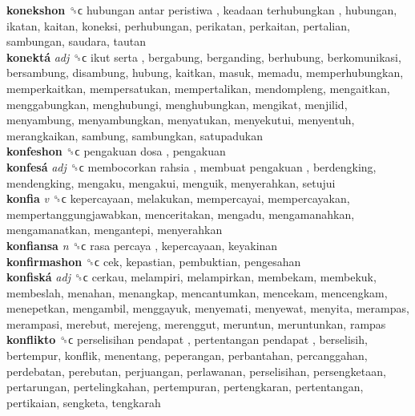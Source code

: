 \textbf{konekshon} ␝ϲ   hubungan antar peristiwa ,  keadaan terhubungkan , hubungan, ikatan, kaitan, koneksi, perhubungan, perikatan, perkaitan, pertalian, sambungan, saudara, tautan  \\
\textbf{konektá} \emph{adj}  ␝ϲ   ikut serta , bergabung, berganding, berhubung, berkomunikasi, bersambung, disambung, hubung, kaitkan, masuk, memadu, memperhubungkan, memperkaitkan, mempersatukan, mempertalikan, mendompleng, mengaitkan, menggabungkan, menghubungi, menghubungkan, mengikat, menjilid, menyambung, menyambungkan, menyatukan, menyekutui, menyentuh, merangkaikan, sambung, sambungkan, satupadukan  \\
\textbf{konfeshon} ␝ϲ   pengakuan dosa , pengakuan  \\
\textbf{konfesá} \emph{adj}  ␝ϲ   membocorkan rahsia ,  membuat pengakuan , berdengking, mendengking, mengaku, mengakui, menguik, menyerahkan, setujui  \\
\textbf{konfia} \emph{v}  ␝ϲ  kepercayaan, melakukan, mempercayai, mempercayakan, mempertanggungjawabkan, menceritakan, mengadu, mengamanahkan, mengamanatkan, mengantepi, menyerahkan  \\
\textbf{konfiansa} \emph{n}  ␝ϲ   rasa percaya , kepercayaan, keyakinan  \\
\textbf{konfirmashon} ␝ϲ  cek, kepastian, pembuktian, pengesahan  \\
\textbf{konfiská} \emph{adj}  ␝ϲ  cerkau, melampiri, melampirkan, membekam, membekuk, membeslah, menahan, menangkap, mencantumkan, mencekam, mencengkam, menepetkan, mengambil, menggayuk, menyemati, menyewat, menyita, merampas, merampasi, merebut, merejeng, merenggut, meruntun, meruntunkan, rampas  \\
\textbf{konflikto} ␝ϲ   perselisihan pendapat ,  pertentangan pendapat , berselisih, bertempur, konflik, menentang, peperangan, perbantahan, percanggahan, perdebatan, perebutan, perjuangan, perlawanan, perselisihan, persengketaan, pertarungan, pertelingkahan, pertempuran, pertengkaran, pertentangan, pertikaian, sengketa, tengkarah  \\

